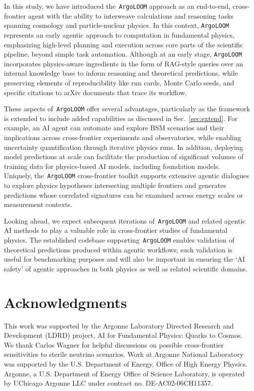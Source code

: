 \documentclass[final,3p,times,sort,compress]{elsarticle}
\newcommand{\AL}{\texttt{ArgoLOOM}\xspace}
\begin{document}
%
In this study, we have introduced the~\AL approach as an end-to-end, cross-frontier
agent with the ability to interweave calculations and reasoning tasks spanning
cosmology and particle-nuclear physics.
%
In this context, \AL represents an early agentic approach
to computation in fundamental physics, emphasizing high-level planning
and execution across core parts of the scientific pipeline, beyond
simple task automation.
%
Although at an early stage, \AL incorporates physics-aware ingredients
in the form of RAG-style queries over an internal knowledge base to
inform reasoning and theoretical predictions, while preserving elements
of reproducibility like run cards, Monte Carlo seeds, and specific
citations to arXiv documents that trace its workflow.

These aspects of~\AL offer several advantages, particularly as the framework is extended to include added capabilities as discussed in Sec.~\ref{sec:extend}. For example, an AI agent can automate and  explore BSM scenarios and their implications across cross-frontier experiments and observatories, while enabling uncertainty quantification through iterative physics runs.
%
In addition, deploying model predictions at scale can facilitate the production of significant volumes of training data for physics-based AI models, including foundation models.
%
Uniquely, the~\AL cross-frontier toolkit supports extensive agentic dialogues to explore physics hypotheses intersecting multiple frontiers and generates predictions whose correlated signatures can be examined across energy scales or measurement contexts.

Looking ahead, we expect subsequent iterations of~\AL and related agentic AI methods to play a valuable role in cross-frontier studies of fundamental physics.
%
The established codebase supporting~\AL enables validation of theoretical predictions produced within agentic workflows; such validation is useful for benchmarking purposes and will also be important in ensuring the `AI safety' of agentic approaches in both physics as well as related scientific domains.


\section*{Acknowledgments}
%
%
This work was supported by the Argonne Laboratory Directed Research and Development
(LDRD) project, AI for Fundamental Physics: Quarks to Cosmos. We thank Carlos Wagner for helpful discussions on possible cross-frontier sensitivities to sterile neutrino scenarios. Work at Argonne National Laboratory was supported by the U.S. Department of Energy, Office of High Energy Physics. Argonne, a U.S. Department of Energy Office of Science Laboratory, is operated by UChicago Argonne LLC under contract no. DE-AC02-06CH11357.




%
\end{document}
